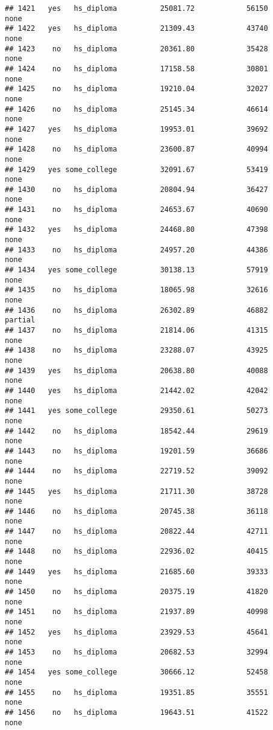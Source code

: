 \documentclass[
]{article}
\begin{document}
\begin{verbatim}
## 1421   yes   hs_diploma          25081.72            56150        none
## 1422   yes   hs_diploma          21309.43            43740        none
## 1423    no   hs_diploma          20361.80            35428        none
## 1424    no   hs_diploma          17158.58            30801        none
## 1425    no   hs_diploma          19210.04            32027        none
## 1426    no   hs_diploma          25145.34            46614        none
## 1427   yes   hs_diploma          19953.01            39692        none
## 1428    no   hs_diploma          23600.87            40994        none
## 1429   yes some_college          32091.67            53419        none
## 1430    no   hs_diploma          20804.94            36427        none
## 1431    no   hs_diploma          24653.67            40690        none
## 1432   yes   hs_diploma          24468.80            47398        none
## 1433    no   hs_diploma          24957.20            44386        none
## 1434   yes some_college          30138.13            57919        none
## 1435    no   hs_diploma          18065.98            32616        none
## 1436    no   hs_diploma          26302.89            46882     partial
## 1437    no   hs_diploma          21814.06            41315        none
## 1438    no   hs_diploma          23288.07            43925        none
## 1439   yes   hs_diploma          20638.80            40088        none
## 1440   yes   hs_diploma          21442.02            42042        none
## 1441   yes some_college          29350.61            50273        none
## 1442    no   hs_diploma          18542.44            29619        none
## 1443    no   hs_diploma          19201.59            36686        none
## 1444    no   hs_diploma          22719.52            39092        none
## 1445   yes   hs_diploma          21711.30            38728        none
## 1446    no   hs_diploma          20745.38            36118        none
## 1447    no   hs_diploma          20822.44            42711        none
## 1448    no   hs_diploma          22936.02            40415        none
## 1449   yes   hs_diploma          21685.60            39333        none
## 1450    no   hs_diploma          20375.19            41820        none
## 1451    no   hs_diploma          21937.89            40998        none
## 1452   yes   hs_diploma          23929.53            45641        none
## 1453    no   hs_diploma          20682.53            32994        none
## 1454   yes some_college          30666.12            52458        none
## 1455    no   hs_diploma          19351.85            35551        none
## 1456    no   hs_diploma          19643.51            41522        none

\end{verbatim}
\end{document}
